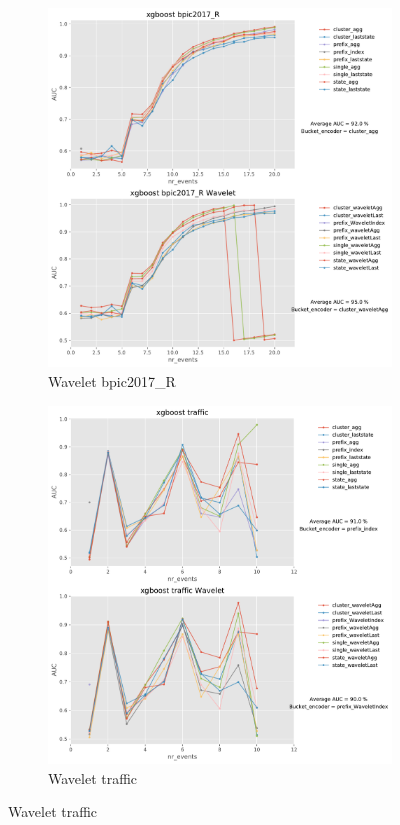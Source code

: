 \begin{figure}[!htbp] %

	\begin{subfigure}{0.48\textwidth}
		\includegraphics[width=\linewidth]{images/wavelet/graphs2/bpic2017_R.pdf}
		\caption{Wavelet bpic2017\_R} \label{fig:b17rw}
	\end{subfigure}\hspace*{\fill}
	\begin{subfigure}{0.48\textwidth}
		\includegraphics[width=\linewidth]{images/wavelet/graphs2/traffic.pdf}
		\caption{Wavelet traffic} \label{fig:trafw}
	\end{subfigure}
	

\end{figure}
